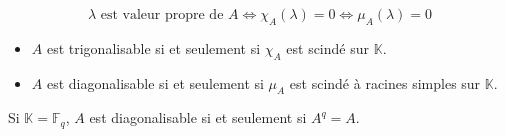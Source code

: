 
	\begin{proposition}
		\[ \lambda \text{ est valeur propre de } A \iff \chi_A(\lambda) = 0 \iff \mu_A(\lambda) = 0 \]
	\end{proposition}


	\begin{proposition}
		\begin{itemize}
			\item $A$ est trigonalisable si et seulement si $\chi_A$ est scindé sur $\mathbb{K}$.
			\item $A$ est diagonalisable si et seulement si $\mu_A$ est scindé à racines simples sur $\mathbb{K}$.
		\end{itemize}
	\end{proposition}

	\begin{remark}
		Si $\mathbb{K} = \mathbb{F}_q$, $A$ est diagonalisable si et seulement si $A^q = A$.
	\end{remark}

